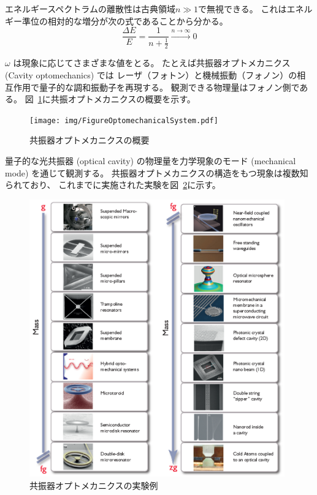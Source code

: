 エネルギースペクトラムの離散性は古典領域$n\gg1$で無視できる。
これはエネルギー準位の相対的な増分が次の式であることから分かる。
\begin{equation}
  \frac{\Delta E}{E} = \frac{1}{n+\frac{1}{2}}
  \overset{n\rightarrow\infty}{\longrightarrow}0
\end{equation}

$\omega$ は現象に応じてさまざまな値をとる。
たとえば共振器オプトメカニクス (Cavity optomechanics) では
レーザ（フォトン）と機械振動（フォノン）の相互作用で量子的な調和振動子を再現する。
観測できる物理量はフォノン側である。
図~\ref{fig:FigureOptomechanicalSystem}に共振オプトメカニクスの概要を示す。
\begin{figure}[tbp]
  \begin{center}
    \texttt{[image: img/FigureOptomechanicalSystem.pdf]}
    \caption{共振器オプトメカニクスの概要~\cite{aspelmeyer2014cavity}}\label{fig:FigureOptomechanicalSystem}
  \end{center}
\end{figure}
量子的な光共振器 (optical cavity) の物理量を力学現象のモード (mechanical mode) を通じて観測する。
共振器オプトメカニクスの構造をもつ現象は複数知られており、
これまでに実施された実験を図~\ref{fig:Figure_Overview_OptomechanicsFinal}に示す。
\begin{figure}[tbp]
  \begin{center}
    \includegraphics[width=11cm]{img/Figure_Overview_OptomechanicsFinal.png}
    \caption{共振器オプトメカニクスの実験例}\label{fig:Figure_Overview_OptomechanicsFinal}
  \end{center}
\end{figure}
